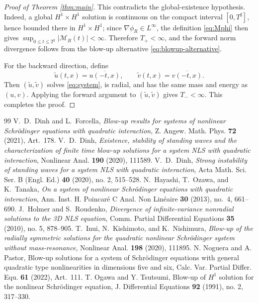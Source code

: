 \documentclass[10pt,a4paper]{amsart}
\numberwithin{equation}{section}
\begin{document}
\begin{proof}[Proof of Theorem \ref{thm:main}]
This contradicts the global-existence hypothesis.  Indeed, a global $H^1\times H^1$ solution is continuous on the compact interval $[0,T^\sharp]$, hence bounded there in $H^1\times H^1$; since $\nabla\phi_R\in L^\infty$, the definition \eqref{eq:Mphi} then gives $\sup_{0\le t\le T^\sharp}|\mathcal M_R(t)|<\infty$.  Therefore $T_+<\infty$, and the forward norm divergence follows from the blow-up alternative \eqref{eq:blowup-alternative}.

For the backward direction, define
\[
 \widetilde u(t,x)=\overline{u(-t,x)}, \qquad \widetilde v(t,x)=\overline{v(-t,x)}.
\]
Then $(\widetilde u,\widetilde v)$ solves \eqref{eq:system}, is radial, and has the same mass and energy as $(u,v)$.  Applying the forward argument to $(\widetilde u,\widetilde v)$ gives $T_-<\infty$.  This completes the proof.
\end{proof}


\begin{thebibliography}{99}
 V.~D.~Dinh and L.~Forcella, \emph{Blow-up results for systems of nonlinear Schr\"odinger equations with quadratic interaction}, Z. Angew. Math. Phys. \textbf{72} (2021), Art.~178.
 V.~D.~Dinh, \emph{Existence, stability of standing waves and the characterization of finite time blow-up solutions for a system NLS with quadratic interaction}, Nonlinear Anal. \textbf{190} (2020), 111589.
 V.~D.~Dinh, \emph{Strong instability of standing waves for a system NLS with quadratic interaction}, Acta Math. Sci. Ser. B (Engl. Ed.) \textbf{40} (2020), no. 2, 515--528.
 N.~Hayashi, T.~Ozawa, and K.~Tanaka, \emph{On a system of nonlinear Schr\"odinger equations with quadratic interaction}, Ann. Inst. H. Poincar\'e C Anal. Non Lin\'eaire \textbf{30} (2013), no.~4, 661--690.
 J.~Holmer and S.~Roudenko, \emph{Divergence of infinite-variance nonradial solutions to the 3D NLS equation}, Comm. Partial Differential Equations \textbf{35} (2010), no. 5, 878--905.
 T.~Inui, N.~Kishimoto, and K.~Nishimura, \emph{Blow-up of the radially symmetric solutions for the quadratic nonlinear Schr\"odinger system without mass-resonance}, Nonlinear Anal. \textbf{198} (2020), 111895.
 N. Noguera and A. Pastor, Blow-up solutions for a system of Schr\"odinger equations with general quadratic type nonlinearities in dimensions five and six, Calc. Var. Partial Differ. Equ. \textbf{61} (2022), Art.~111.
 T. Ogawa and Y. Tsutsumi, Blow-up of $H^1$ solution for the nonlinear Schr\"odinger equation, J. Differential Equations \textbf{92} (1991), no. 2, 317--330.
\end{thebibliography}
\end{document}
